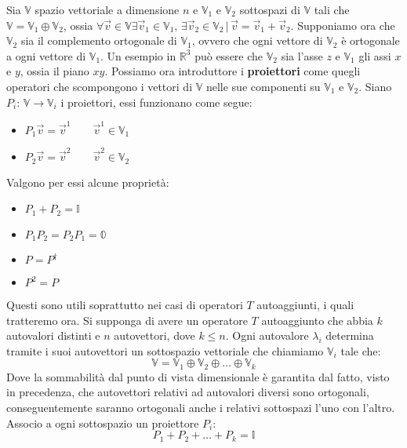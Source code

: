 Sia $\mathbb{V}$ spazio vettoriale a dimensione $n$ e $\mathbb{V}_1$ e $\mathbb{V}_2$ sottospazi di $\mathbb{V}$ tali che $\mathbb{V}=\mathbb{V}_1 \oplus \mathbb{V}_2$, ossia $\forall \vec{v} \in\mathbb{V} \exists \vec{v}_1 \in \mathbb{V}_1, \, \exists \vec{v}_2 \in \mathbb{V}_2 \, \vert \, \vec{v} = \vec{v}_1+\vec{v}_2$. Supponiamo ora che $\mathbb{V}_2$ sia il complemento ortogonale di $\mathbb{V}_1$, ovvero che ogni vettore di $\mathbb{V}_2$ è ortogonale a ogni vettore di $\mathbb{V}_1$. Un esempio in $\mathbb{R}^3$ può essere che $\mathbb{V}_2$ sia l'asse $z$ e $\mathbb{V}_1$ gli assi $x$ e $y$, ossia il piano $xy$. Possiamo ora introduttore i \textbf{proiettori} come quegli operatori che scompongono i vettori di $\mathbb{V}$ nelle sue componenti su $\mathbb{V}_1$ e $\mathbb{V}_2$. Siano $P_i: \, \mathbb{V} \longrightarrow \mathbb{V}_i$ i proiettori, essi funzionano come segue:
\begin{itemize}
    \item $P_1 \vec{v} = \vec{v}^1 \qquad \vec{v}^1 \in \mathbb{V}_1$
    \item $P_2 \vec{v} = \vec{v}^2 \qquad \vec{v}^2 \in \mathbb{V}_2$
\end{itemize}
Valgono per essi alcune proprietà:
\begin{itemize}
    \item $P_1 + P_2 = \mathbb{I}$
    \item $P_1P_2 = P_2P_1 = \mathbb{0}$
    \item $P=P^{\dagger}$
    \item $P^2=P$
\end{itemize}
Questi sono utili soprattutto nei casi di operatori $T$ autoaggiunti, i quali tratteremo ora. Si supponga di avere un operatore $T$ autoaggiunto che abbia $k$ autovalori distinti e $n$ autovettori, dove $k\leq n$. Ogni autovalore $\lambda_i$ determina tramite i suoi autovettori un sottospazio vettoriale che chiamiamo $\mathbb{V}_i$ tale che:
\begin{equation*}
    \mathbb{V} = \mathbb{V}_1 \oplus \mathbb{V}_2 \oplus \dots \oplus \mathbb{V}_k
\end{equation*}
Dove la sommabilità dal punto di vista dimensionale è garantita dal fatto, visto in precedenza, che autovettori relativi ad autovalori diversi sono ortogonali, conseguentemente saranno ortogonali anche i relativi sottospazi l'uno con l'altro. Associo a ogni sottospazio un proiettore $P_i$:
\begin{equation*}
    P_1 + P_2 + \dots + P_k = \mathbb{I}
\end{equation*}
